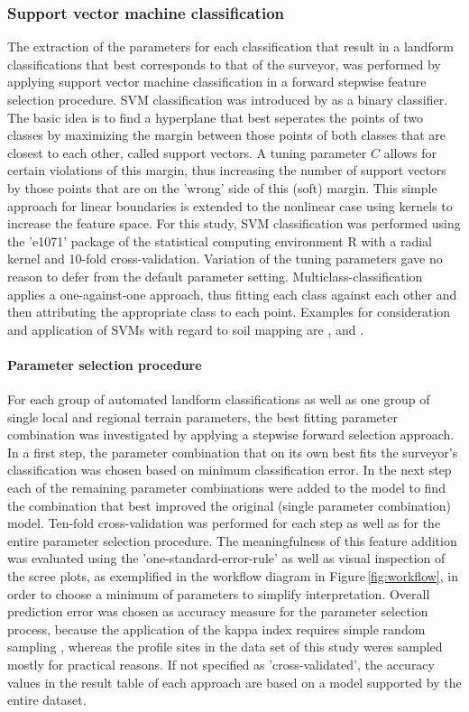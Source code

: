 \documentclass[preprint,12pt,authoryear]{elsarticle}
\begin{document}
\subsubsection{Support vector machine classification}
The extraction of the parameters for each classification that result in a landform classifications that best corresponds to that of the surveyor, was performed by applying support vector machine classification in a forward stepwise feature selection procedure. SVM classification was introduced by \cite{Cortes1995} as a binary classifier. The basic idea is to find a hyperplane that best seperates the points of two classes by maximizing the margin between those points of both classes that are closest to each other, called support vectors. A tuning parameter $C$ allows for certain violations of this margin, thus increasing the number of support vectors by those points that are on the 'wrong' side of this (soft) margin. This simple approach for linear boundaries is extended to the nonlinear case using kernels to increase the feature space. For this study, SVM classification was performed using the 'e1071' package \citep{meyer2014} of the statistical computing environment R \citep{cran2014} with a radial kernel and 10-fold cross-validation. Variation of the tuning parameters gave  no reason to defer from the default parameter setting. Multiclass-classification applies a one-against-one approach, thus fitting each class against each other and then attributing the appropriate class to each point. Examples for consideration and application of SVMs with regard to soil mapping are \cite{Ballabio2009}, \cite{Behrens2006} and \cite{Rossel2010}.
\paragraph{Parameter selection procedure} For each group of automated landform classifications as well as one group of single local and regional terrain parameters, the best fitting parameter combination was investigated by applying a stepwise forward selection approach. In a first step, the parameter combination that on its own best fits the surveyor's classification was chosen based on minimum classification error. In the next step each of the remaining parameter combinations were added to the model to find the combination that best improved the original (single parameter combination) model. Ten-fold cross-validation was performed for each step as well as for the entire parameter selection procedure. The meaningfulness of this feature addition was evaluated using the 'one-standard-error-rule' \citep{James2013} as well as visual inspection of the scree plots, as exemplified in the workflow diagram in Figure\,\ref{fig:workflow}, in order to choose a minimum of parameters to simplify interpretation. Overall prediction error was chosen as accuracy measure for the parameter selection process, because the application of the kappa index requires simple random sampling \citep{Congalton1991}, whereas the profile sites in the data set of this study weres sampled mostly for practical reasons. If not specified as 'cross-validated', the accuracy values in the result table of each approach are based on a model supported by the entire dataset. 
\end{document}
